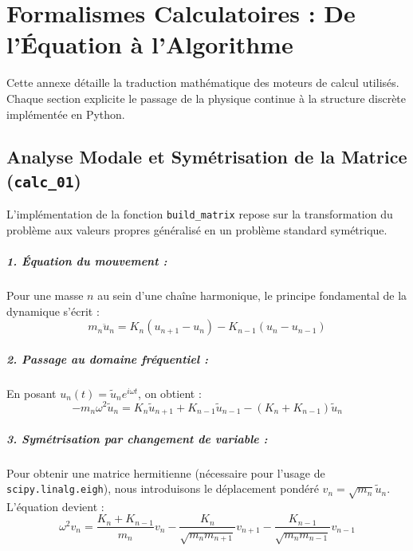\chapter{Formalismes Calculatoires : De l'Équation à l'Algorithme}\label{annexe:computational_logic}

Cette annexe détaille la traduction mathématique des moteurs de calcul utilisés. Chaque section explicite le passage de la physique continue à la structure discrète implémentée en Python.

\section{Analyse Modale et Symétrisation de la Matrice (\texttt{calc\_01})}

L'implémentation de la fonction \texttt{build\_matrix} repose sur la transformation du problème aux valeurs propres généralisé en un problème standard symétrique.

\paragraph{1. Équation du mouvement :}
Pour une masse $n$ au sein d'une chaîne harmonique, le principe fondamental de la dynamique s'écrit :
\begin{equation}
    m_n \ddot{u}_n = K_n(u_{n+1} - u_n) - K_{n-1}(u_n - u_{n-1})
\end{equation}

\paragraph{2. Passage au domaine fréquentiel :}
En posant $u_n(t) = \tilde{u}_n e^{i\omega t}$, on obtient :
\begin{equation}
    -m_n \omega^2 \tilde{u}_n = K_n \tilde{u}_{n+1} + K_{n-1} \tilde{u}_{n-1} - (K_n + K_{n-1}) \tilde{u}_n
\end{equation}

\paragraph{3. Symétrisation par changement de variable :}
Pour obtenir une matrice hermitienne (nécessaire pour l'usage de \texttt{scipy.linalg.eigh}), nous introduisons le déplacement pondéré $v_n = \sqrt{m_n} \tilde{u}_n$. L'équation devient :
\begin{equation}
    \omega^2 v_n = \frac{K_n + K_{n-1}}{m_n} v_n - \frac{K_n}{\sqrt{m_n m_{n+1}}} v_{n+1} - \frac{K_{n-1}}{\sqrt{m_n m_{n-1}}} v_{n-1}
\end{equation}

